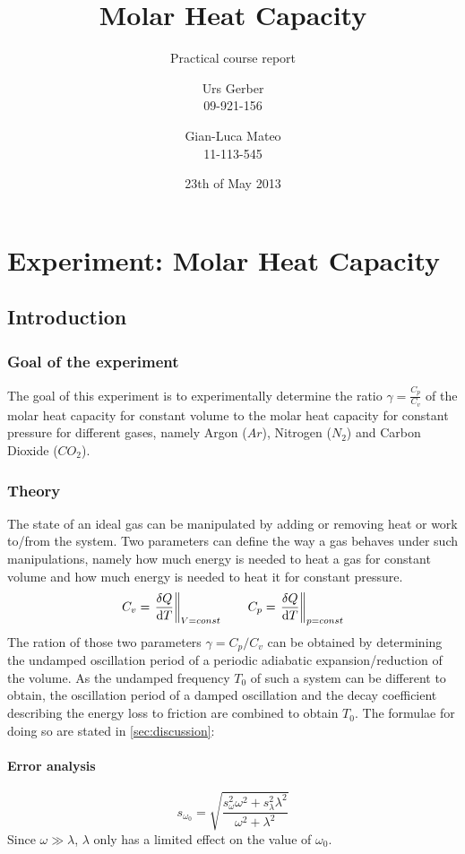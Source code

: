\documentclass{scrreprt}
\author{Urs Gerber\\09-921-156 \and Gian-Luca Mateo\\11-113-545}
\date{23th of May 2013}
\title{Molar Heat Capacity}
\subtitle{Practical course report}
\begin{document}
\maketitle

\tableofcontents
\newpage

\chapter{Experiment: Molar Heat Capacity}
\section{Introduction}


\subsection{Goal of the experiment}
The goal of this experiment is to experimentally determine the ratio $\gamma = \frac{C_p}{C_v}$ of the molar heat capacity for constant volume to the molar heat capacity for constant pressure for different gases, namely Argon ($Ar$), Nitrogen ($N_2$) and Carbon Dioxide ($CO_2$). 
 
\subsection{Theory} 
The state of an ideal gas can be manipulated by adding or removing heat or work to/from the system. Two parameters can define the way a gas behaves under such manipulations, namely how much energy is needed to heat a gas for constant volume and how much energy is needed to heat it for constant pressure.
\begin{equation}
C_v = \left. \frac{\delta Q}{\dif{T}} \right\|_{V=const}
\qquad C_p = \left. \frac{\delta Q}{\dif{T}} \right\|_{p=const} 
\end{equation}
The ration of those two parameters $\gamma = C_p/C_v$ can be obtained by determining the undamped oscillation period of a periodic adiabatic expansion/reduction of the volume. As the undamped frequency $T_0$ of such a system can be different to obtain, the oscillation period of a damped oscillation and the decay coefficient describing the energy loss to friction are combined to obtain $T_0$. The formulae for doing so are stated in \ref{sec:discussion}: 
\
\subsubsection{Error analysis}
\begin{equation}
s_{\omega_0} = \sqrt{\frac{s_\omega^2 \omega^2 + s_\lambda^2 \lambda^2}{\omega^2+\lambda^2}}
\end{equation}
Since $\omega \gg \lambda$, $\lambda$ only has a limited effect on the value of $\omega_0$.\\
\end{document}
